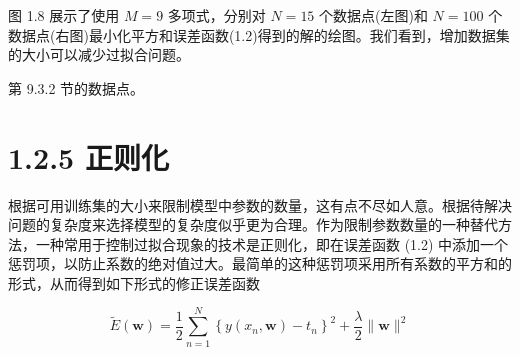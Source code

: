 \documentclass[10pt]{article}
\begin{document}
图 1.8 展示了使用 \(M = 9\) 多项式，分别对 \(N = {15}\) 个数据点(左图)和 \(N = {100}\) 个数据点(右图)最小化平方和误差函数(1.2)得到的解的绘图。我们看到，增加数据集的大小可以减少过拟合问题。

第 9.3.2 节的数据点。

\section*{1.2.5 正则化}

根据可用训练集的大小来限制模型中参数的数量，这有点不尽如人意。根据待解决问题的复杂度来选择模型的复杂度似乎更为合理。作为限制参数数量的一种替代方法，一种常用于控制过拟合现象的技术是正则化，即在误差函数 (1.2) 中添加一个惩罚项，以防止系数的绝对值过大。最简单的这种惩罚项采用所有系数的平方和的形式，从而得到如下形式的修正误差函数

\[
\widetilde{E}\left( \mathbf{w}\right)  = \frac{1}{2}\mathop{\sum }\limits_{{n = 1}}^{N}{\left\{  y\left( {x}_{n},\mathbf{w}\right)  - {t}_{n}\right\}  }^{2} + \frac{\lambda }{2}\parallel \mathbf{w}{\parallel }^{2} \tag{1.4}
\]

\begin{center}
\end{center}
\end{document}
